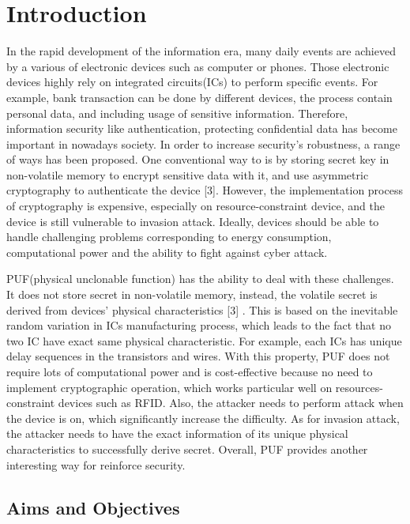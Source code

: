 \chapter{Introduction}

In the rapid development of the information era, many daily events are achieved by a various of electronic devices such as computer or phones.
Those electronic devices highly rely on integrated circuits(ICs) to perform specific events. For example, bank transaction can be done by different devices,
the process contain personal data, and including usage of sensitive information. Therefore, information security like authentication, protecting confidential data
has become important in nowadays society. In order to increase security's robustness, a range of ways has been proposed. One conventional way to is by storing secret key in non-volatile memory to encrypt sensitive data with it,
and use asymmetric cryptography to authenticate the device [3]. However, the implementation process of cryptography is expensive, especially on resource-constraint device, and the device is still vulnerable to invasion attack. Ideally, devices should be able to handle challenging problems corresponding to energy consumption, 
computational power and the ability to fight against cyber attack. \par

PUF(physical unclonable function) has the ability to deal with these challenges. It does not store secret in non-volatile memory, instead, the volatile secret is derived from devices' physical characteristics [3] .
This is based on the inevitable random variation in ICs manufacturing process, which leads to the fact that no two IC have exact same physical characteristic. For example, each ICs has unique delay sequences in the transistors and wires.
With this property, PUF does not require lots of computational power and is cost-effective because no need to implement cryptographic operation, which works particular well on
resources-constraint devices such as RFID. Also, the attacker needs to perform attack when the device is on, which significantly increase the difficulty. As for invasion attack, 
the attacker needs to have the exact information of its unique physical characteristics to successfully derive secret. Overall, PUF provides another interesting way for reinforce security.

\section{Aims and Objectives}

